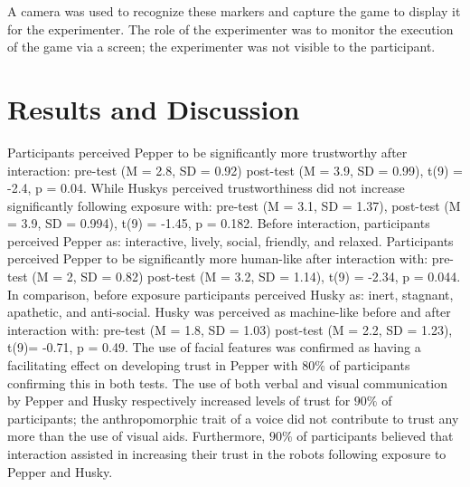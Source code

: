 \documentclass[letterpaper]{article} %
\begin{document}
A camera was used to recognize these markers and capture the game to display it for the experimenter. The role of the experimenter was to monitor the execution of the game via a screen; the experimenter was not visible to the participant.
\section{Results and Discussion  }
Participants perceived Pepper to be significantly more trustworthy after interaction: pre-test (M = 2.8, SD = 0.92) post-test (M = 3.9, SD = 0.99), t(9) = -2.4, p = 0.04. While Huskys perceived trustworthiness did not increase significantly following exposure with: pre-test (M = 3.1, SD = 1.37), post-test (M = 3.9, SD = 0.994), t(9) = -1.45, p = 0.182. Before interaction, participants perceived Pepper as: interactive, lively, social, friendly, and relaxed. Participants perceived Pepper to be significantly more human-like after interaction with: pre-test (M = 2, SD = 0.82) post-test (M = 3.2, SD = 1.14), t(9) = -2.34, p = 0.044. In comparison, before exposure participants perceived Husky as: inert, stagnant, apathetic, and anti-social. Husky was perceived as machine-like before and after interaction with: pre-test (M = 1.8, SD = 1.03) post-test (M = 2.2, SD = 1.23), t(9)= -0.71, p = 0.49. The use of facial features was confirmed as having a facilitating effect on developing trust in Pepper with $80\%$ of participants confirming this in both tests. The use of both verbal and visual communication by Pepper and Husky respectively increased levels of trust for $90\%$ of participants; the anthropomorphic trait of a voice did not contribute to trust any more than the use of visual aids. Furthermore, $90\%$ of participants believed that interaction assisted in increasing their trust in the robots following exposure to Pepper and Husky.
\end{document}
